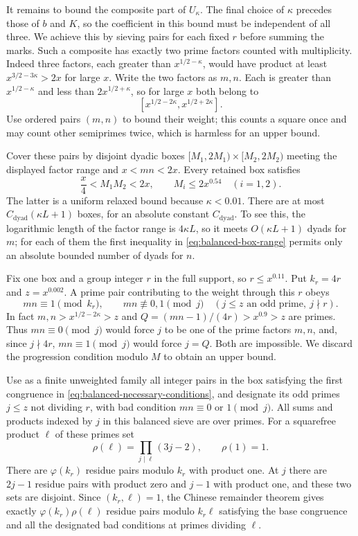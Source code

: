 It remains to bound the composite part of $U_\kappa$.  The final choice of
$\kappa$ precedes those of $b$ and $K$, so the coefficient in this bound
must be independent of all three.  We achieve this by sieving pairs for
each fixed $r$ before summing the marks.  Such a composite has exactly two
prime factors counted with multiplicity.
Indeed three factors, each greater than $x^{1/2-\kappa}$, would have
product at least $x^{3/2-3\kappa}>2x$ for large $x$.  Write the two
factors as $m,n$.  Each is greater than $x^{1/2-\kappa}$ and less
than $2x^{1/2+\kappa}$, so for large $x$ both belong to
\[
 [x^{1/2-2\kappa},x^{1/2+2\kappa}].
\]
Use ordered pairs $(m,n)$ to bound their weight; this counts a square
once and may count other semiprimes twice, which is harmless for an
upper bound.

Cover these pairs by disjoint dyadic boxes
$[M_1,2M_1)\times[M_2,2M_2)$ meeting the displayed factor range and
$x<mn<2x$.  Every retained box satisfies
\begin{equation}\label{eq:balanced-box-range}
 \frac x4<M_1M_2<2x,
 \qquad M_i\le2x^{0.54}\quad(i=1,2).
\end{equation}
The latter is a uniform relaxed bound because $\kappa<0.01$.
There are at most $C_{\mathrm{dyad}}(\kappa L+1)$ boxes, for an
absolute constant $C_{\mathrm{dyad}}$.  To see this, the logarithmic
length of the factor range is $4\kappa L$, so it meets
$O(\kappa L+1)$ dyads for $m$; for each of them the first inequality
in \eqref{eq:balanced-box-range} permits only an absolute bounded
number of dyads for $n$.

Fix one box and a group integer $r$ in the full support, so
$r\le x^{0.11}$.  Put $k_r=4r$ and $z=x^{0.002}$.  A prime pair
contributing to the weight through this $r$ obeys
\begin{equation}\label{eq:balanced-necessary-conditions}
 mn\equiv1\pmod{k_r},
 \qquad
 mn\not\equiv0,1\pmod j
 \quad(j\le z\text{ an odd prime},\ j\nmid r).
\end{equation}
In fact $m,n>x^{1/2-2\kappa}>z$ and
$Q=(mn-1)/(4r)>x^{0.9}>z$ are primes.  Thus $mn\equiv0\pmod j$
would force $j$ to be one of the prime factors $m,n$, and, since
$j\nmid4r$, $mn\equiv1\pmod j$ would force $j=Q$.  Both are
impossible.  We discard the progression condition modulo $M$ to
obtain an upper bound.

Use as a finite unweighted family all integer pairs in the box
satisfying the first congruence in
\eqref{eq:balanced-necessary-conditions}, and designate its odd
primes $j\le z$ not dividing $r$, with bad condition
$mn\equiv0\text{ or }1\pmod j$.  All sums and products indexed by
$j$ in this balanced sieve are over primes.  For a squarefree product
$\ell$ of these primes set
\[
 \rho(\ell)=\prod_{j\mid\ell}(3j-2),\qquad \rho(1)=1.
\]
There are $\varphi(k_r)$ residue pairs modulo $k_r$ with product
one.  At $j$ there are $2j-1$ residue pairs with product zero and
$j-1$ with product one, and these two sets are disjoint.  Since
$(k_r,\ell)=1$, the Chinese remainder theorem gives exactly
$\varphi(k_r)\rho(\ell)$ residue pairs modulo $k_r\ell$ satisfying
the base congruence and all the designated bad conditions at
primes dividing $\ell$.

